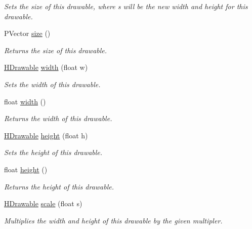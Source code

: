 \begin{DoxyCompactItemize}
\begin{DoxyCompactList}\small\item\em Sets the size of this drawable, where {\ttfamily s} will be the new width and height for this drawable. \end{DoxyCompactList}\item 
P\-Vector \hyperlink{classhype_1_1drawable_1_1_h_drawable_a2336a63a4b1aabf58cbee348ecab5e9b}{size} ()
\begin{DoxyCompactList}\small\item\em Returns the size of this drawable. \end{DoxyCompactList}\item 
\hyperlink{classhype_1_1drawable_1_1_h_drawable}{H\-Drawable} \hyperlink{classhype_1_1drawable_1_1_h_drawable_a85ed7cc70c40332a18befa8e6e538a71}{width} (float w)
\begin{DoxyCompactList}\small\item\em Sets the width of this drawable. \end{DoxyCompactList}\item 
float \hyperlink{classhype_1_1drawable_1_1_h_drawable_a5ea542d92e402b30ed584e03f417f61f}{width} ()
\begin{DoxyCompactList}\small\item\em Returns the width of this drawable. \end{DoxyCompactList}\item 
\hyperlink{classhype_1_1drawable_1_1_h_drawable}{H\-Drawable} \hyperlink{classhype_1_1drawable_1_1_h_drawable_ac3741d321e7fea3771209e5809aef5b4}{height} (float h)
\begin{DoxyCompactList}\small\item\em Sets the height of this drawable. \end{DoxyCompactList}\item 
float \hyperlink{classhype_1_1drawable_1_1_h_drawable_a20f3702ab5c3ba050174503e5d3fae12}{height} ()
\begin{DoxyCompactList}\small\item\em Returns the height of this drawable. \end{DoxyCompactList}\item 
\hyperlink{classhype_1_1drawable_1_1_h_drawable}{H\-Drawable} \hyperlink{classhype_1_1drawable_1_1_h_drawable_a6166d1dff41c05b3402de387b0172cd1}{scale} (float s)
\begin{DoxyCompactList}\small\item\em Multiplies the width and height of this drawable by the given multipler. \end{DoxyCompactList}\item 

\end{DoxyCompactItemize}
